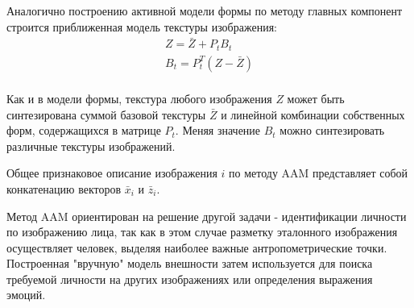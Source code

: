 \documentclass[12pt,a4paper]{article}
\begin{document}
Аналогично построению активной модели формы по методу главных компонент строится приближенная модель текстуры изображения:
\begin{equation}
    \begin{array}{cc}
        Z=\bar{Z}+P_tB_t\\
        B_t=P_t^T(Z-\bar{Z})\\
    \end{array}
\end{equation}

Как и в модели формы, текстура любого изображения $Z$ может быть синтезирована суммой базовой текстуры $\bar{Z}$ и линейной комбинации собственных форм, содержащихся в матрице $P_t$. Меняя значение $B_t$ можно синтезировать различные текстуры изображений.

Общее признаковое описание изображения $i$ по методу AAM представляет собой конкатенацию векторов $\bar{x}_i$ и $\bar{z}_i$.

Метод AAM ориентирован на решение другой задачи - идентификации личности по изображению лица, так как в этом случае разметку эталонного изображения осуществляет человек, выделяя наиболее важные антропометрические точки. Построенная "вручную" модель внешности затем используется для поиска требуемой личности на других изображениях или определения выражения эмоций.
\end{document}
